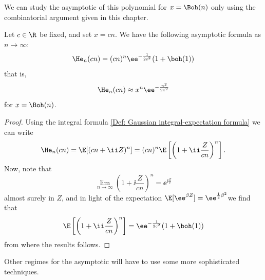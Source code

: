 
We can study the asymptotic of this polynomial for $x = \Boh(n)$ only using the combinatorial argument given in this chapter.

\begin{prop}
	Let $c \in \R$ be fixed, and set $x = c n$. We have the following asymptotic formula as $n \rightarrow \infty$:
	\begin{equation}
		\He_n(cn) = (cn)^n \ee^{-\frac{1}{2c^2}} (1 + \boh(1))
	\end{equation}
	that is,
	\begin{equation}
		\He_n(cn) \approx x^n \ee^{-\frac{n^2}{2x^2}}
	\end{equation}
	for $x = \Boh(n)$.
	\label{Prop: Hermite Asymptotic o(n)}
\end{prop}
\begin{proof}
	Using the integral formula \ref{Def: Gaussian integral-expectation formula} we can write
	\begin{equation}
		\He_n(cn) = \E[(cn + \ii Z)^n] = (cn)^n \E\left[\left(1 + \ii\frac{Z}{cn} \right)^n \right].
	\end{equation}
	Now, note that 
	\begin{equation}
		\lim_{n\rightarrow \infty} \left(1 + \ii\frac{Z}{cn} \right)^n = \ee^{\ii \frac{Z}{c}}
	\end{equation}
	almost surely in $Z$, and in light of the expectation $\E[\ee^{\beta Z}] = \ee^{\frac{1}{2} \beta^2}$we find that 
	\begin{equation}
		\E\left[\left(1 + \ii\frac{Z}{cn} \right)^n \right] = \ee^{-\frac{1}{2c^2}}(1+ \boh(1))
	\end{equation}
	from where the results follows.
\end{proof}

Other regimes for the asymptotic will have to use some more sophisticated techniques.
